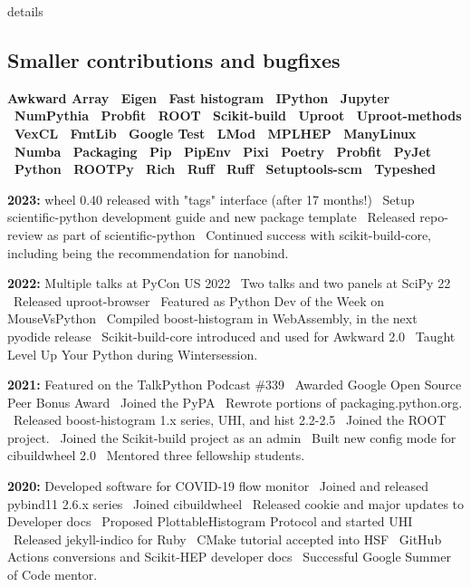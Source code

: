 \documentclass[10pt,letterpaper]{moderncv}
\begin{document}
\begin{taggedblock}{details}
\subsection{Smaller contributions and bugfixes}
\textbf{%
	Awkward Array \textbullet\
	Eigen \textbullet\
	Fast histogram \textbullet\
	IPython \textbullet\
	Jupyter \textbullet\
	NumPythia \textbullet\
	Probfit \textbullet\
	ROOT \textbullet\
	Scikit-build \textbullet\
	Uproot \textbullet\
	Uproot-methods \textbullet\
	VexCL \textbullet\
    FmtLib \textbullet\
    Google Test \textbullet\
    LMod \textbullet\
    MPLHEP \textbullet\
    ManyLinux \textbullet\
    Numba \textbullet\
    Packaging \textbullet\
    Pip \textbullet\
    PipEnv \textbullet\
    Pixi \textbullet\
    Poetry \textbullet\
    Probfit \textbullet\
    PyJet \textbullet\
    Python \textbullet\
    ROOTPy \textbullet\
    Rich \textbullet\
    Ruff \textbullet\
    Ruff \textbullet\
    Setuptools-scm \textbullet\
    Typeshed
}
\end{taggedblock}



\textbf{2023:}
wheel 0.40 released with "tags" interface (after 17 months!) \textbullet\
Setup scientific-python development guide and new package template \textbullet\
Released repo-review as part of scientific-python \textbullet\
Continued success with scikit-build-core, including being the recommendation for nanobind.

\textbf{2022:}
Multiple talks at PyCon US 2022 \textbullet\
Two talks and two panels at SciPy 22 \textbullet\
Released uproot-browser \textbullet\
Featured as Python Dev of the Week on MouseVsPython \textbullet\
Compiled boost-histogram in WebAssembly, in the next pyodide release \textbullet\
Scikit-build-core introduced and used for Awkward 2.0 \textbullet\
Taught Level Up Your Python during Wintersession.

\textbf{2021:}
Featured on the TalkPython Podcast \#339 \textbullet\
Awarded Google Open Source Peer Bonus Award \textbullet\
Joined the PyPA \textbullet\ Rewrote portions of packaging.python.org. \textbullet\
Released boost-histogram 1.x series, UHI, and hist 2.2-2.5 \textbullet\
Joined the ROOT project. \textbullet\
Joined the Scikit-build project as an admin \textbullet\
Built new config mode for cibuildwheel 2.0 \textbullet\
Mentored three fellowship students.

\textbf{2020:}
Developed software for COVID-19 flow monitor \textbullet\
Joined and released pybind11 2.6.x series \textbullet\
Joined cibuildwheel \textbullet\
Released cookie and major updates to Developer docs \textbullet\
Proposed PlottableHistogram Protocol and started UHI \textbullet\
Released jekyll-indico for Ruby \textbullet\
CMake tutorial accepted into HSF \textbullet\
GitHub Actions conversions and Scikit-HEP developer docs \textbullet\
Successful Google Summer of Code mentor.
\end{document}
